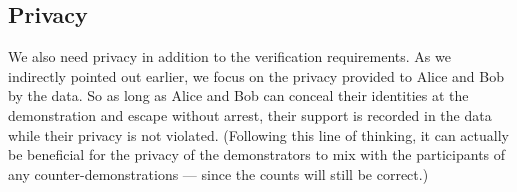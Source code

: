 
\subsection{Privacy}%
\label{Privacy}

We also need privacy in addition to the verification requirements.
As we indirectly pointed out earlier, we focus on the privacy provided to Alice 
and Bob by the data.
So as long as Alice and Bob can conceal their identities at the demonstration 
and escape without arrest, their support is recorded in the data while their 
privacy is not violated.
(Following this line of thinking, it can actually be beneficial for the privacy 
of the demonstrators to mix with the participants of any counter-demonstrations 
--- since the counts will still be correct.)

